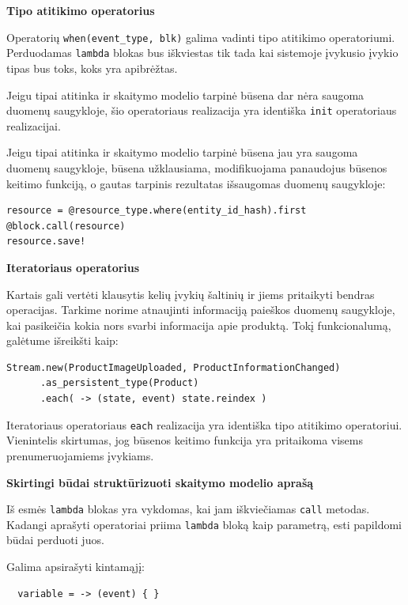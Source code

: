 \textbf{Tipo atitikimo operatorius}

Operatorių \lstinline|when(event_type, blk)| galima vadinti tipo atitikimo operatoriumi. Perduodamas \lstinline|lambda| blokas bus iškviestas tik tada kai sistemoje įvykusio įvykio tipas bus toks, koks yra apibrėžtas.

Jeigu tipai atitinka ir skaitymo modelio tarpinė būsena dar nėra saugoma duomenų saugykloje, šio operatoriaus realizacija yra identiška \lstinline|init| operatoriaus realizacijai.

Jeigu tipai atitinka ir skaitymo modelio tarpinė būsena jau yra saugoma duomenų saugykloje, būsena užklausiama, modifikuojama panaudojus būsenos keitimo funkciją, o gautas tarpinis rezultatas išsaugomas duomenų saugykloje:

\begin{lstlisting}
resource = @resource_type.where(entity_id_hash).first
@block.call(resource)
resource.save!
\end{lstlisting}

\textbf{Iteratoriaus operatorius}

Kartais gali vertėti klausytis kelių įvykių šaltinių ir jiems pritaikyti bendras operacijas. Tarkime norime atnaujinti informaciją paieškos duomenų saugykloje, kai pasikeičia kokia nors svarbi informacija apie produktą. Tokį funkcionalumą, galėtume išreikšti kaip:

\begin{lstlisting}[]
  Stream.new(ProductImageUploaded, ProductInformationChanged)
      .as_persistent_type(Product)
      .each( -> (state, event) state.reindex )
\end{lstlisting}

Iteratoriaus operatoriaus \lstinline|each| realizacija yra identiška tipo atitikimo operatoriui. Vienintelis skirtumas, jog būsenos keitimo funkcija yra pritaikoma visems prenumeruojamiems įvykiams.

\textbf{Skirtingi būdai struktūrizuoti skaitymo modelio aprašą}

Iš esmės \lstinline|lambda| blokas yra vykdomas, kai jam iškviečiamas \lstinline|call| metodas. Kadangi aprašyti operatoriai priima \lstinline|lambda| bloką kaip parametrą, esti papildomi būdai perduoti juos.

Galima apsirašyti kintamąjį:

\begin{lstlisting}
  variable = -> (event) { }
\end{lstlisting}

